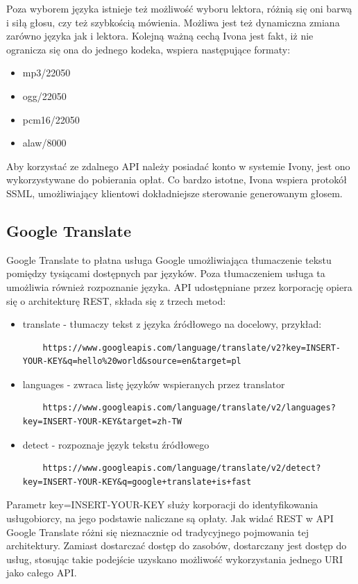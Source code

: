 Poza wyborem języka istnieje też możliwość wyboru lektora, różnią się oni barwą i siłą głosu, czy też szybkością mówienia. Możliwa jest też dynamiczna zmiana zarówno języka jak i lektora. Kolejną ważną cechą Ivona jest fakt, iż nie ogranicza się ona do jednego kodeka, wspiera następujące formaty:
\begin{itemize}
	\item mp3/22050
	\item ogg/22050
	\item pcm16/22050
	\item alaw/8000
\end{itemize}
 Aby korzystać ze zdalnego API należy posiadać konto w systemie Ivony, jest ono wykorzystywane do pobierania opłat. Co bardzo istotne, Ivona wspiera protokół SSML, umożliwiający klientowi dokładniejsze sterowanie generowanym głosem. 

\subsection{Google Translate}
Google Translate to płatna usługa Google umożliwiająca tłumaczenie tekstu pomiędzy tysiącami dostępnych par języków. Poza tłumaczeniem usługa ta umożliwia również rozpoznanie języka. API udostępniane przez korporację opiera się o architekturę REST, składa się z trzech metod:
\begin{itemize}
	\item translate - tłumaczy tekst z języka źródłowego na docelowy, przykład:
	\begin{lstlisting}
	https://www.googleapis.com/language/translate/v2?key=INSERT-YOUR-KEY&q=hello%20world&source=en&target=pl
	\end{lstlisting}
	\item languages - zwraca listę języków wspieranych przez translator
	\begin{lstlisting}
	https://www.googleapis.com/language/translate/v2/languages?key=INSERT-YOUR-KEY&target=zh-TW
	\end{lstlisting}
	\item detect - rozpoznaje język tekstu źródłowego
	\begin{lstlisting}
	https://www.googleapis.com/language/translate/v2/detect?key=INSERT-YOUR-KEY&q=google+translate+is+fast
	\end{lstlisting}
\end{itemize}
Parametr key=INSERT-YOUR-KEY służy korporacji do identyfikowania usługobiorcy, na jego podstawie naliczane są opłaty. Jak widać REST w API Google Translate różni się nieznacznie od tradycyjnego pojmowania tej architektury. Zamiast dostarczać dostęp do zasobów, dostarczany jest dostęp do usług, stosując takie podejście uzyskano możliwość wykorzystania jednego URI jako całego API. 

